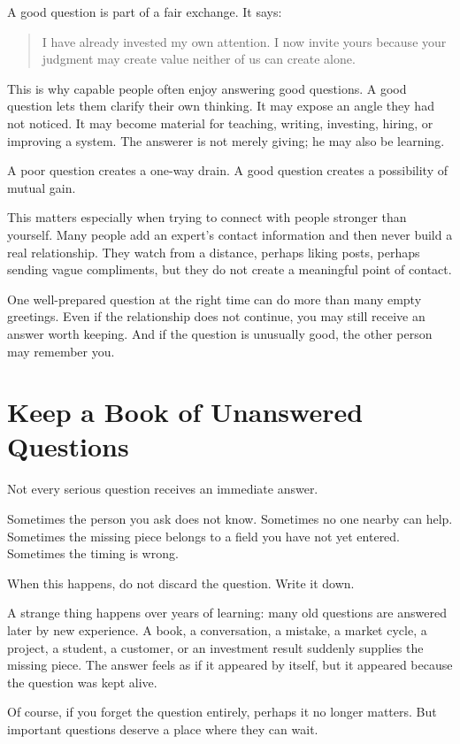 A good question is part of a fair exchange. It says:

\begin{quote}
I have already invested my own attention. I now invite yours because your judgment may create value neither of us can create alone.
\end{quote}

This is why capable people often enjoy answering good questions. A good question lets them clarify their own thinking. It may expose an angle they had not noticed. It may become material for teaching, writing, investing, hiring, or improving a system. The answerer is not merely giving; he may also be learning.

A poor question creates a one-way drain. A good question creates a possibility of mutual gain.

This matters especially when trying to connect with people stronger than yourself. Many people add an expert's contact information and then never build a real relationship. They watch from a distance, perhaps liking posts, perhaps sending vague compliments, but they do not create a meaningful point of contact.

One well-prepared question at the right time can do more than many empty greetings. Even if the relationship does not continue, you may still receive an answer worth keeping. And if the question is unusually good, the other person may remember you.

\section*{Keep a Book of Unanswered Questions}

Not every serious question receives an immediate answer.

Sometimes the person you ask does not know. Sometimes no one nearby can help. Sometimes the missing piece belongs to a field you have not yet entered. Sometimes the timing is wrong.

When this happens, do not discard the question. Write it down.

A strange thing happens over years of learning: many old questions are answered later by new experience. A book, a conversation, a mistake, a market cycle, a project, a student, a customer, or an investment result suddenly supplies the missing piece. The answer feels as if it appeared by itself, but it appeared because the question was kept alive.

Of course, if you forget the question entirely, perhaps it no longer matters. But important questions deserve a place where they can wait.

